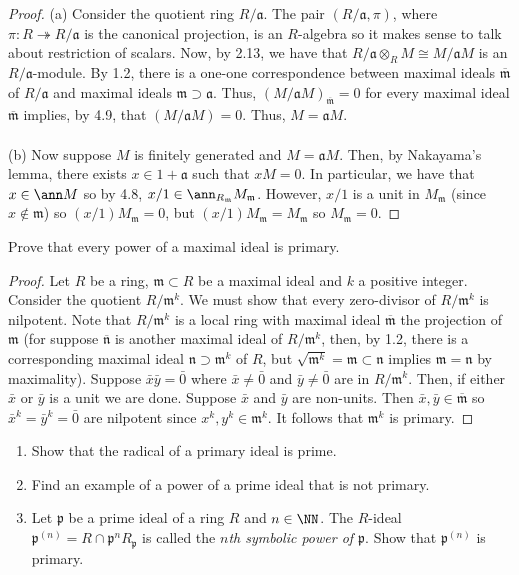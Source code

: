 \begin{proof}
(a) Consider the quotient ring $R/\mathfrak{a}$. The pair
$(R/\mathfrak{a},\pi)$, where $\pi\colon R\twoheadrightarrow
R/\mathfrak{a}$ is the canonical projection, is an $R$-algebra so
it makes sense to talk about restriction of scalars. Now, by
2.13, we have that $R/\mathfrak{a}\otimes_R M\cong
M/\mathfrak{a}M$ is an $R/\mathfrak{a}$-module. By 1.2, there is
a one-one correspondence between maximal ideals
$\overbar{\mathfrak{m}}$ of $R/\mathfrak{a}$ and maximal ideals
$\mathfrak{m}\supset\mathfrak{a}$. Thus,
$(M/\mathfrak{a}M)_{\overbar{\mathfrak{m}}}=0$ for every maximal ideal
$\overbar{\mathfrak{m}}$ implies, by 4.9, that $(M/\mathfrak{a}M)=0$. Thus,
$M=\mathfrak{a}M$.
\\\\
(b) Now suppose $M$ is finitely generated and
$M=\mathfrak{a}M$. Then, by Nakayama's lemma, there exists $x\in
1+\mathfrak{a}$ such that $xM=0$. In particular, we have that
$x\in\ann M$ so by 4.8, $x/1\in\ann_{R_{\mathfrak{m}}}
M_\mathfrak{m}$. However, $x/1$ is a unit in $M_{\mathfrak{m}}$
(since $x\notin\mathfrak{m}$) so $(x/1)M_{\mathfrak{m}}=0$, but
$(x/1)M_{\mathfrak{m}}=M_{\mathfrak{m}}$ so
$M_{\mathfrak{m}}=0$.
\end{proof}
\newpage
\begin{problem}
Prove that every power of a maximal ideal is primary.
\end{problem}
\begin{proof}
Let $R$ be a ring, $\mathfrak{m}\subset R$ be a maximal ideal and
$k$ a positive integer. Consider the quotient
$R/\mathfrak{m}^k$. We must show that every zero-divisor of
$R/\mathfrak{m}^k$ is nilpotent. Note that $R/\mathfrak{m}^k$ is
a local ring with maximal ideal $\overbar{\mathfrak{m}}$ the
projection of $\mathfrak{m}$ (for suppose
$\overbar{\mathfrak{n}}$ is another maximal ideal of
$R/\mathfrak{m}^k$, then, by 1.2, there is a corresponding
maximal ideal $\mathfrak{n}\supset\mathfrak{m}^k$ of $R$, but
$\sqrt{\mathfrak{m}^k}=\mathfrak{m}\subset\mathfrak{n}$ implies
$\mathfrak{m}=\mathfrak{n}$ by maximality). Suppose $\bar x\bar
y=\bar 0$ where $\bar x\neq\bar 0$ and $\bar y\neq \bar 0$ are in
$R/\mathfrak{m}^k$. Then, if either $\bar x$ or $\bar y$ is a
unit we are done. Suppose $\bar x$ and $\bar y$ are
non-units. Then $\bar x,\bar y\in\overbar{\mathfrak{m}}$ so $\bar
x^k=\bar y^k=\bar 0$ are nilpotent since
$x^k,y^k\in\mathfrak{m}^k$. It follows that $\mathfrak{m}^k$ is
primary.
\end{proof}
\newpage
\begin{problem}
\begin{enumerate}[noitemsep,label=(\alph*)]
\item Show that the radical of a primary ideal is prime.
\item Find an example of a power of a prime ideal that is not
  primary.
\item Let $\mathfrak{p}$ be a prime ideal of a ring $R$ and
  $n\in\NN$. The $R$-ideal
  $\mathfrak{p}^{(n)}=R\cap\mathfrak{p}^nR_{\mathfrak{p}}$ is
  called the \emph{$n$th symbolic power of $\mathfrak{p}$}. Show
  that $\mathfrak{p}^{(n)}$ is primary.
\end{enumerate}
\end{problem}

